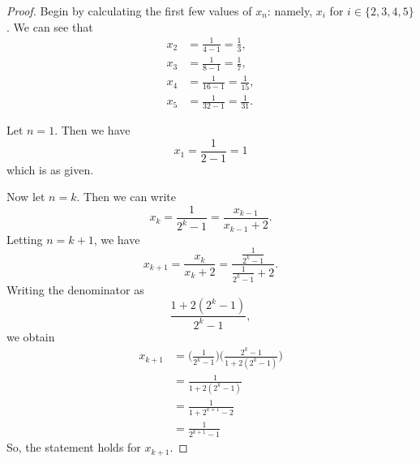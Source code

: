 \documentclass[12pt]{amsart}
\theoremstyle{case}
\begin{document}
	\begin{proof}
		Begin by calculating the first few values of $x_n$: namely, $x_i$ for $i \in \{2,3,4,5\}$.
		We can see that
		\begin{equation*}
		\begin{split}
		x_2 & = \frac{1}{4-1} = \frac{1}{3}, \\ x_3 & = \frac{1}{8-1} = \frac{1}{7}, \\ x_4 & = \frac{1}{16-1} = \frac{1}{15}, \\ x_5 & = \frac{1}{32-1} = \frac{1}{31} .
		\end{split}
		\end{equation*}
		
		Let $n=1$. Then we have
		$$x_1 = \frac{1}{2-1} = 1$$
		which is as given.
		
		Now let $n=k$. Then we can write
		$$ x_k = \frac{1}{2^k - 1} = \frac{x_{k-1}}{x_{k-1}+2}.$$
		Letting $n=k+1$, we have
		$$ x_{k+1} = \frac{x_k}{x_k + 2} = \frac{\frac{1}{2^k-1}}{\frac{1}{2^k - 1} + 2} . $$
		Writing the denominator as
		$$\frac{1+2(2^k-1)}{2^k-1} , $$
		we obtain
		\begin{equation*}
		\begin{split}
		x_{k+1} & = \Big( \frac{1}{2^k -1} \Big) \Big( \frac{2^k-1}{1+2(2^k-1)} \Big) \\
		& = \frac{1}{1+2(2^k-1)} \\
		& = \frac{1}{1 + 2^{k+1} - 2} \\
		& = \frac{1}{2^{k+1} - 1}
		\end{split}
		\end{equation*}
		So, the statement holds for $x_{k+1}$.
		
	\end{proof}
	
	
	
	
	
	
	
	
	
	
	
	
	
	
	
	
	
	
	
	
	
	
	
	
	
	
\end{document}

